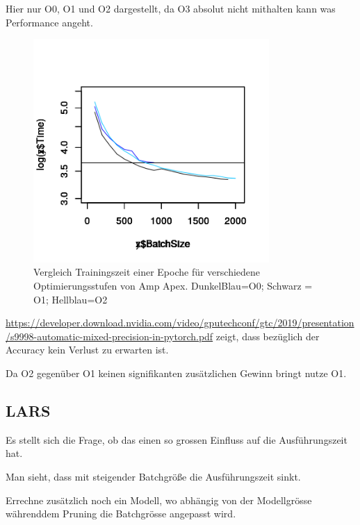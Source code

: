 Hier nur O0, O1 und O2 dargestellt, da O3 absolut nicht mithalten kann was Performance angeht.

\begin{figure}[h]
 \centering
 \includegraphics[width=0.8\textwidth]{KapitelPartB/Images/timeVsBatchSize_Amp.png}
 \caption{Vergleich Trainingszeit einer Epoche für verschiedene Optimierungsstufen von Amp Apex. DunkelBlau=O0; Schwarz = O1; Hellblau=O2}
 \label{fig:amp}
\end{figure}
\url{https://developer.download.nvidia.com/video/gputechconf/gtc/2019/presentation/s9998-automatic-mixed-precision-in-pytorch.pdf} zeigt, dass bezüglich der Accuracy kein Verlust zu erwarten ist.

Da O2 gegenüber O1 keinen signifikanten zusätzlichen Gewinn bringt nutze O1.



\subsection{LARS}\label{sec:lars}




Es stellt sich die Frage, ob das einen so grossen Einfluss auf die Ausführungszeit hat.



Man sieht, dass mit steigender Batchgröße die Ausführungszeit sinkt. 

Errechne zusätzlich noch ein Modell, wo abhängig von der Modellgrösse währenddem Pruning die Batchgrösse angepasst wird.





